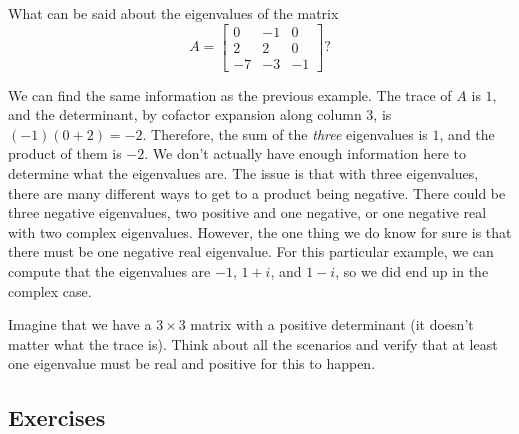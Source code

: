 \begin{example}
What can be said about the eigenvalues of the matrix
\begin{equation*}
A = \begin{bmatrix}
0 & -1 &  0 \\
2 & 2 &  0 \\
-7 &-3 & -1
\end{bmatrix}?
\end{equation*}
\end{example}

\begin{exampleSol}
We can find the same information as the previous example. The trace of $A$ is $1$, and the determinant, by cofactor expansion along column 3, is $(-1)(0 + 2) = -2$. Therefore, the sum of the \emph{three} eigenvalues is $1$, and the product of them is $-2$. We don't actually have enough information here to determine what the eigenvalues are. The issue is that with three eigenvalues, there are many different ways to get to a product being negative. There could be three negative eigenvalues, two positive and one negative, or one negative real with two complex eigenvalues. However, the one thing we do know for sure is that there must be one negative real eigenvalue. For this particular example, we can compute that the eigenvalues are $-1$, $1+i$, and $1-i$, so we did end up in the complex case. 
\end{exampleSol}

\begin{exercise}
Imagine that we have a $3 \times 3$ matrix with a positive determinant (it doesn't matter what the trace is). Think about all the scenarios and verify that at least one eigenvalue must be real and positive for this to happen. 
\end{exercise}


\subsection{Exercises}

